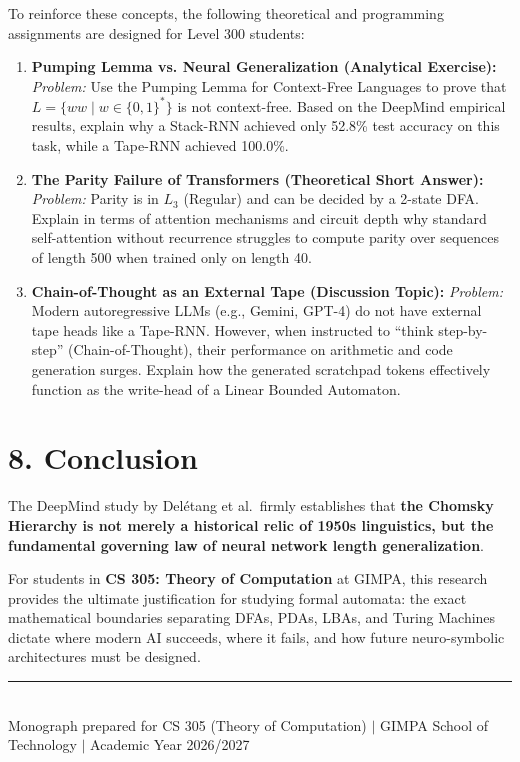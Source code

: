 \documentclass[11pt,a4paper]{article}
\begin{document}
To reinforce these concepts, the following theoretical and programming assignments are designed for Level 300 students:

\begin{enumerate}[leftmargin=1.5em, itemsep=6pt]
    \item \textbf{Pumping Lemma vs. Neural Generalization (Analytical Exercise):}
    \textit{Problem:} Use the Pumping Lemma for Context-Free Languages to prove that $L = \{w w \mid w \in \{0, 1\}^*\}$ is not context-free. Based on the DeepMind empirical results, explain why a Stack-RNN achieved only 52.8\% test accuracy on this task, while a Tape-RNN achieved 100.0\%.
    
    \item \textbf{The Parity Failure of Transformers (Theoretical Short Answer):}
    \textit{Problem:} Parity is in $L_3$ (Regular) and can be decided by a 2-state DFA. Explain in terms of attention mechanisms and circuit depth why standard self-attention without recurrence struggles to compute parity over sequences of length 500 when trained only on length 40.
    
    \item \textbf{Chain-of-Thought as an External Tape (Discussion Topic):}
    \textit{Problem:} Modern autoregressive LLMs (e.g., Gemini, GPT-4) do not have external tape heads like a Tape-RNN. However, when instructed to ``think step-by-step'' (Chain-of-Thought), their performance on arithmetic and code generation surges. Explain how the generated scratchpad tokens effectively function as the write-head of a Linear Bounded Automaton.
\end{enumerate}

\section{8. Conclusion}

The DeepMind study by Del{\'e}tang et al.\ firmly establishes that \textbf{the Chomsky Hierarchy is not merely a historical relic of 1950s linguistics, but the fundamental governing law of neural network length generalization}. 

For students in \textbf{CS 305: Theory of Computation} at GIMPA, this research provides the ultimate justification for studying formal automata: the exact mathematical boundaries separating DFAs, PDAs, LBAs, and Turing Machines dictate where modern AI succeeds, where it fails, and how future neuro-symbolic architectures must be designed.

\vspace{12pt}
\begin{center}
    \rule{0.6\linewidth}{0.4pt}\\[6pt]
    {\footnotesize\color{darkgray}Monograph prepared for CS 305 (Theory of Computation) $|$ GIMPA School of Technology $|$ Academic Year 2026/2027}
\end{center}
\end{document}
